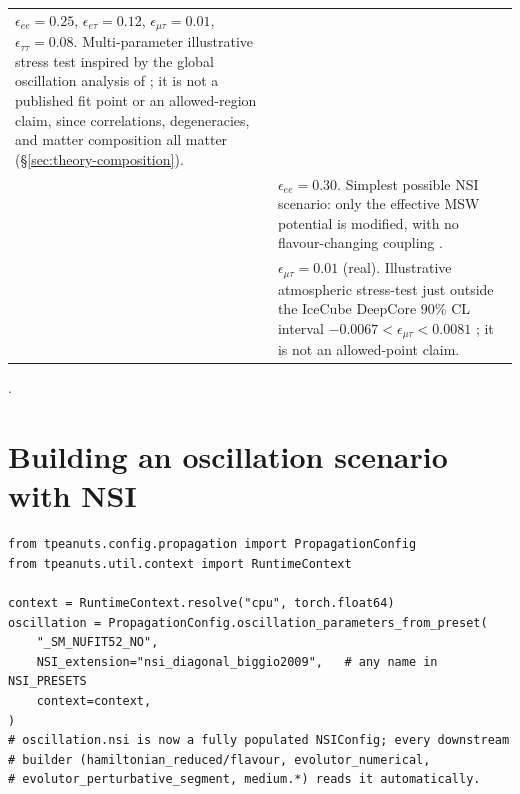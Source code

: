 \begin{implbox}
\begin{center}
\begin{tabular}{@{}ll@{}}
  \parbox[t]{9.4cm}{$\epsilon_{ee}=0.25$, $\epsilon_{e\tau}=0.12$,
  $\epsilon_{\mu\tau}=0.01$, $\epsilon_{\tau\tau}=0.08$. Multi-parameter
  illustrative stress test inspired by the global oscillation analysis of
  \textcite{Esteban2018LMADark}; it is not a published fit point or an
  allowed-region claim, since correlations, degeneracies, and matter
  composition all matter (\S\ref{sec:theory-composition}).} \\[24pt]
\parbox[t]{3.2cm}{} &
  \parbox[t]{9.4cm}{$\epsilon_{ee}=0.30$. Simplest possible NSI scenario:
  only the effective MSW potential is modified, with no flavour-changing
  coupling \parencite{BiggioBlennowFM2009}.} \\[10pt]
\parbox[t]{3.2cm}{} &
  \parbox[t]{9.4cm}{$\epsilon_{\mu\tau}=0.01$ (real). Illustrative
  atmospheric stress-test just outside the IceCube DeepCore 90\% CL interval
  $-0.0067<\epsilon_{\mu\tau}<0.0081$
  \parencite{IceCube2018MutauNSI}; it is not an allowed-point claim.} \\[14pt]
\bottomrule
\end{tabular}
\end{center}
\end{implbox}

\begin{refbox}
\cite{BiggioBlennowFM2009,Esteban2018LMADark,IceCube2022NSI,Agarwalla2016DUNENSI,Kelly2017HyperKNSI,Fukasawa2017HyperKNSI,IceCube2018MutauNSI}.
\end{refbox}

\section{Building an oscillation scenario with NSI}

\begin{examplebox}[title={Attaching an NSI preset to a propagation config}]
\begin{lstlisting}[style=tpython]
from tpeanuts.config.propagation import PropagationConfig
from tpeanuts.util.context import RuntimeContext

context = RuntimeContext.resolve("cpu", torch.float64)
oscillation = PropagationConfig.oscillation_parameters_from_preset(
    "_SM_NUFIT52_NO",
    NSI_extension="nsi_diagonal_biggio2009",   # any name in NSI_PRESETS
    context=context,
)
# oscillation.nsi is now a fully populated NSIConfig; every downstream
# builder (hamiltonian_reduced/flavour, evolutor_numerical,
# evolutor_perturbative_segment, medium.*) reads it automatically.
\end{lstlisting}
\end{examplebox}

